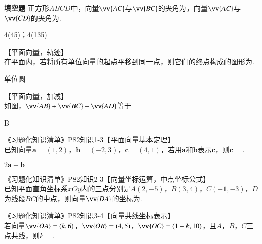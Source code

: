\begin{exercise}{\bf 填空题}
      正方形$ABCD$中，向量$\vv{AC}$与$\vv{BC}$的夹角为\tk，向量$\vv{AC}$与$\vv{CD}$的夹角为\tk.
      \begin{answer}
        \dfrac{\piup}4(45\degree)；\dfrac{3\piup}4(135\degree)
      \end{answer}
    \item 【平面向量，轨迹】\\
      在平面内，若将所有单位向量的起点平移到同一点，则它们的终点构成的图形为\tk.
      \begin{answer}
        单位圆
      \end{answer}
    \item 【平面向量，加减】\\
      如图，$\vv{AB}+\vv{BC}-\vv{AD}$等于\xz
      \begin{minipage}[b]{0.7\linewidth}
      \end{minipage}\hfill
      \begin{minipage}[h]{0.3\linewidth}
      \end{minipage}
      \begin{answer}
        B
      \end{answer}
    \item 《习题化知识清单》P82知识1-3【平面向量基本定理】\\
      已知向量$\bm a=(1,2)$，$\bm b=(-2,3)$，$\bm c=(4,1)$，若用$\bm a$和$\bm b$表示$\bm c$，则$\bm c=$\tk.
      \begin{answer}
        $2\bm a-\bm b$
      \end{answer}
    \item 《习题化知识清单》P82知识2-3【向量坐标运算，中点坐标公式】\\
      已知平面直角坐标系$xOy$内的三点分别是$A(2,-5)$，$B(3,4)$，$C(-1,-3)$，$D$为线段$BC$的中点，则向量$\vv{DA}$的坐标为\tk.
    \item 《习题化知识清单》P82知识3-4【向量共线坐标表示】\\
      若向量$\vv{OA}=(k,6)$，$\vv{OB}=(4,5)$，$\vv{OC}=(1-k,10)$，且$A$，$B$，$C$三点共线，则$k=$\tk.
      \begin{answer}

\end{answer}
\end{exercise}
